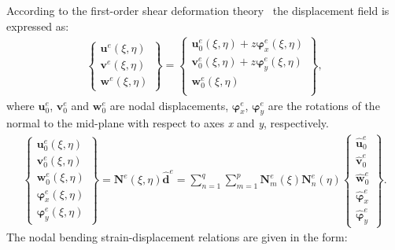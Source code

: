 \documentclass[sensors,article,submit,moreauthors,pdftex]{Definitions/mdpi}
\begin{document}
According to the first-order shear deformation theory~\cite{reissner1945effect, mindlin1951influence} the displacement field is expressed as:
\begin{eqnarray}
\left \{ \begin{array}{c}
\textbf{u}^e(\xi,\eta) \\
\textbf{v}^e(\xi,\eta) \\
\textbf{w}^e(\xi,\eta)
\end{array} \right\} = 
\left \{ \begin{array}{c}
\textbf{u}_0^e(\xi,\eta) + z\boldsymbol{\varphi}_x^e(\xi,\eta)\\
\textbf{v}_0^e(\xi,\eta) + z\boldsymbol{\varphi}_y^e(\xi,\eta)\\
\textbf{w}_0^e(\xi,\eta) \\
\end{array} \right\},
\end{eqnarray}
where \(\textbf{u}_0^e\), \(\textbf{v}_0^e\) and \(\textbf{w}_0^e\) are nodal displacements, \(\boldsymbol{\varphi}_x^e\), \(\boldsymbol{\varphi}_y^e\) are the rotations of the normal to the mid-plane with respect to axes \textit{x} and \textit{y}, respectively.
\begin{eqnarray}
\left \{\begin{array}{c}
\textbf{u}_0^e(\xi,\eta) \\
\textbf{v}_0^e(\xi,\eta) \\
\textbf{w}_0^e(\xi,\eta) \\
\boldsymbol{\varphi}_x^e(\xi,\eta) \\
\boldsymbol{\varphi}_y^e(\xi,\eta)
\end{array} \right\}
= \textbf{N}^e(\xi,\eta)\widehat{\textbf{d}}^e
= \sum_{n=1}^q\sum_{m=1}^p\textbf{N}_m^e(\xi)\textbf{N}_n^e(\eta)
\left \{ \begin{array}{c}
\widehat{\textbf{u}}_0^e \\
\widehat{\textbf{v}}_0^e \\
\widehat{\textbf{w}}_0^e \\
\widehat{\boldsymbol{\varphi}}_x^e \\
\widehat{\boldsymbol{\varphi}}_y^e
\end{array} \right \}.
\end{eqnarray}
The nodal bending strain-displacement relations are given in the form:
\end{document}
